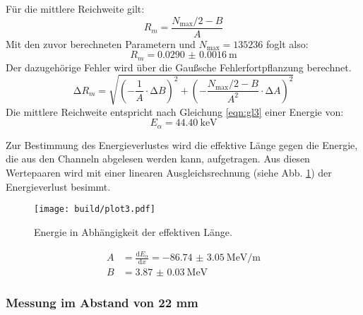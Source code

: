 Für die mittlere Reichweite gilt:
\begin{equation}
  R_m = \frac{N_\text{max}/2 - B}{A}
  \label{eqn:r1}
\end{equation}
Mit den zuvor berechneten Parametern und $N_\text{max} = 135236$ foglt also:
\begin{equation*}
  R_m = \SI{0.0290(16)}{\meter}
\end{equation*}
Der dazugehörige Fehler wird über die Gaußsche Fehlerfortpflanzung berechnet.
\begin{equation}
  \increment R_m = \sqrt{(-\frac{1}{A} \cdot \increment B)^2+(-\frac{N_\text{max}/2 - B}{A^2} \cdot \increment A)^2}
  \label{eqn:r2}
\end{equation}
Die mittlere Reichweite entspricht nach Gleichung \eqref{eqn:gl3} einer Energie von:
\begin{equation*}
  E_\alpha = \SI{44.40}{\kilo\eV}
\end{equation*}

Zur Bestimmung des Energieverlustes wird die effektive Länge gegen die Energie, die aus den Channeln abgelesen werden kann, aufgetragen.
Aus diesen Wertepaaren wird mit einer linearen Ausgleichsrechnung (siehe Abb. \ref{fig:plot2}) der Energieverlust besimmt.
\begin{figure}
  \centering
  \texttt{[image: build/plot3.pdf]}
  \caption{Energie in Abhängigkeit der effektiven Länge.}
  \label{fig:plot2}
\end{figure}
\begin{align*}
  A &= \frac{\text{d}E_\alpha}{\text{d}x} = \SI{-86.74(305)}{\mega\eV\per\meter} \\
  B &= \SI{3.87(3)}{\mega\eV}
\end{align*}
\FloatBarrier

\subsubsection{Messung im Abstand von 22 mm}

